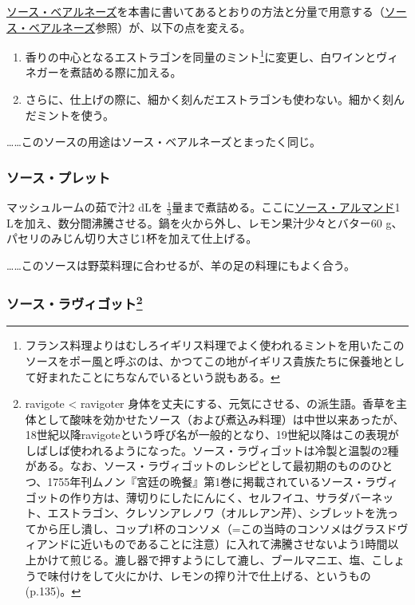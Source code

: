 \begin{recette}
\protect\hyperlink{sauce-bearnaise}{ソース・ベアルネーズ}を本書に書いてあるとおりの方法と分量で用意する（\protect\hyperlink{sauce-bearnaise}{ソース・ベアルネーズ}参照）が、以下の点を変える。

\begin{enumerate}
\def\labelenumi{\arabic{enumi}.}
\item
  香りの中心となるエストラゴンを同量のミント\footnote{フランス料理よりはむしろイギリス料理でよく使われるミントを用いたこのソースをポー風と呼ぶのは、かつてこの地がイギリス貴族たちに保養地として好まれたことにちなんでいるという説もある。}に変更し、白ワインとヴィネガーを煮詰める際に加える。
\item
  さらに、仕上げの際に、細かく刻んだエストラゴンも使わない。細かく刻んだミントを使う。
\end{enumerate}

\ldots{}\ldots{}このソースの用途はソース・ベアルネーズとまったく同じ。

\atoaki{}

\hypertarget{sauce-poulette}{%
\subsubsection{ソース・プレット}\label{sauce-poulette}}


 

マッシュルームの茹で汁2 dLを
\(\frac{1}{3}\)量まで煮詰める。ここに\protect\hyperlink{sauce-allemande}{ソース・アルマンド}1
Lを加え、数分間沸騰させる。鍋を火から外し、レモン果汁少々とバター60
g、パセリのみじん切り大さじ1杯を加えて仕上げる。

\ldots{}\ldots{}このソースは野菜料理に合わせるが、羊の足の料理にもよく合う。

\atoaki{}

\hypertarget{sauce-ravigote}{%
\subsubsection[ソース・ラヴィゴット]{\texorpdfstring{ソース・ラヴィゴット\footnote{ravigote
  \textless{} ravigoter
  身体を丈夫にする、元気にさせる、の派生語。香草を主体として酸味を効かせたソース（および煮込み料理）は中世以来あったが、18世紀以降ravigoteという呼び名が一般的となり、19世紀以降はこの表現がしばしば使われるようになった。ソース・ラヴィゴットは冷製と温製の2種がある。なお、ソース・ラヴィゴットのレシピとして最初期のもののひとつ、1755年刊ムノン『宮廷の晩餐』第1巻に掲載されているソース・ラヴィゴットの作り方は、薄切りにしたにんにく、セルフイユ、サラダバーネット、エストラゴン、クレソンアレノワ（オルレアン芹）、シブレットを洗ってから圧し潰し、コップ1杯のコンソメ（=この当時のコンソメはグラスドヴィアンドに近いものであることに注意）に入れて沸騰させないよう1時間以上かけて煎じる。漉し器で押すようにして漉し、ブールマニエ、塩、こしょうで味付けをして火にかけ、レモンの搾り汁で仕上げる、というもの(p.135)。}}{ソース・ラヴィゴット}}\label{sauce-ravigote}}


\end{recette}
